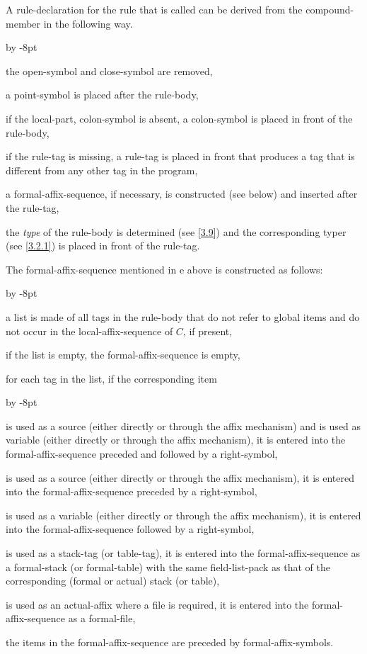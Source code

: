\documentclass{article}
\newcommand\g[1]{{\sf #1}}
\renewenvironment{itemize}{\begin{list}{}{%
\advance\leftmargin by -8pt%
\setlength\itemsep{0ex plus 0.2ex}%
\setlength\partopsep{3pt}%
\setlength\topsep{2pt plus 2pt}%
\setlength\parsep{0pt plus 2pt}%
}}{\end{list}}
\let\oref\ref
\let\ref\oref
\begin{document}
\smallskip
A \g{rule-declaration} for the rule that is called can be derived from the
\g{compound-member} in the following way.
\begin{itemize}
\item[a.] the \g{open-symbol} and \g{close-symbol} are removed,
\item[b.] a \g{point-symbol} is placed after the \g{rule-body},
\item[c.] if the \g{local-part, colon-symbol} is absent, a \g{colon-symbol}
is placed in front of the \g{rule-body},
\item[d.] if the \g{rule-tag} is missing, a \g{rule-tag} is placed in front
that produces a \g{tag} that is different from any other \g{tag} in the program,
\item[e.] a \g{formal-affix-sequence}, if necessary, is constructed (see
below) and inserted after the \g{rule-tag},
\item[f.] the \emph{type} of the \g{rule-body} is determined (see \ref{3.9})
 and the
corresponding \g{typer} (see \ref{3.2.1}) is placed in front of the \g{rule-tag}.
\end{itemize}
The \g{formal-affix-sequence} mentioned in e above is constructed as
follows:
\begin{itemize}
\item[a.] a list is made of all tags in the \g{rule-body} that do not refer
to global items and do not occur in the \g{local-affix-sequence} of $C$, if
present,
\item[b.] if the list is empty, the \g{formal-affix-sequence} is empty,
\item[c.] for each tag in the list, if the corresponding item
\begin{itemize}
\item[1.] is used as a \g{source} (either directly or through the affix
mechanism) and is
used as \g{variable} (either directly or through the affix mechanism), it is entered
into the \g{formal-affix-sequence} preceded and followed by a \g{right-symbol},
\item[2.] is used as a \g{source} (either directly or through the affix
mechanism), it is
entered into the \g{formal-affix-sequence} preceded by a \g{right-symbol},
\item[3.] is used as a \g{variable} (either directly or through the affix
mechanism),
it is entered into the \g{formal-affix-sequence} followed by a \g{right-symbol},
\item[4.] is used as a \g{stack-tag} (or \g{table-tag}), it is entered into
the \g{formal-affix-sequence} as a
\g{formal-stack} (or \g{formal-table}) with the same \g{field-list-pack}
as that of the corresponding (formal or actual) stack (or table),
\item[5.] is used as an \g{actual-affix} where a file is required, it is
entered into the \g{formal-affix-sequence} as a \g{formal-file},
\end{itemize}
\item[d.] the items in the \g{formal-affix-sequence} are preceded by
\g{formal-affix-symbol}s.
\end{itemize}
\end{document}
